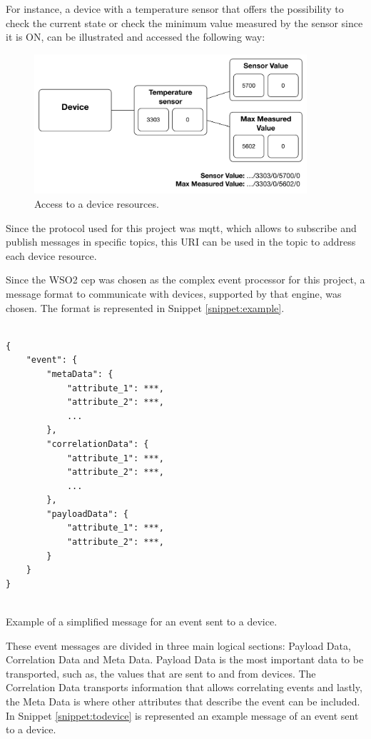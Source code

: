For instance, a device with a temperature sensor that offers the possibility to check the current state or check the minimum value measured by the sensor since it is ON, can be illustrated and accessed the following way:


\begin{figure}[H]
	\centering
	\includegraphics[width=0.9\textwidth]{figures/obj2.png}
	\caption{Access to a device resources.}
	\label{fig:obj2}
\end{figure}
	
Since the protocol used for this project was \ac{mqtt}, which allows to subscribe and publish messages in specific topics, this URI can be used in the topic to address each device resource. 


Since the WSO2 \ac{cep} was chosen as the complex event processor for this project\cite{helder}, a message format to communicate with devices, supported by that engine, was chosen. The format is represented in Snippet \ref{snippet:example}.

\begin{listing}[H]
\begin{verbatim}

{
    "event": {
        "metaData": { 
            "attribute_1": ***,
            "attribute_2": ***,
            ...
        },
        "correlationData": {
            "attribute_1": ***,
            "attribute_2": ***,
            ...
        }, 
        "payloadData": {
            "attribute_1": ***, 
            "attribute_2": ***,
        }
    }
}


\end{verbatim}
\caption{Example of a simplified message for an event sent to a device.}
\label{snippet:example}
\end{listing}

These event messages are divided in three main logical sections: Payload Data, Correlation Data and Meta Data. Payload Data is the most important data to be transported, such as, the values that are sent to and from devices. The Correlation Data transports information that allows correlating events and lastly, the Meta Data is where other attributes that describe the event can be included. In Snippet \ref{snippet:todevice} is represented an example message of an event sent to a device.

